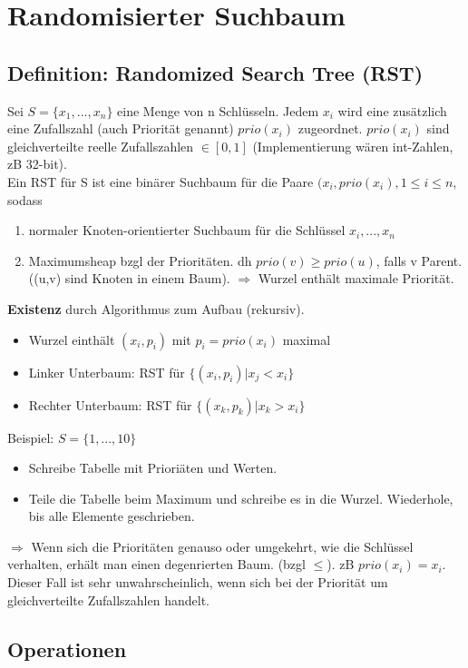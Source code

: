 \documentclass[10pt,a4paper]{article}
\begin{document}
\section*{Randomisierter Suchbaum}
\subsection*{Definition: Randomized Search Tree (RST)}
Sei $ S=\{x_1,...,x_n\} $ eine Menge von n Schlüsseln. Jedem $ x_i $ wird eine zusätzlich eine Zufallszahl (auch Priorität genannt) $ prio(x_i) $ zugeordnet. $ prio(x_i) $ sind gleichverteilte reelle Zufallszahlen $ \in [0,1] $ (Implementierung wären int-Zahlen, zB 32-bit). \\
Ein RST für S ist eine binärer Suchbaum für die Paare $ (x_i, prio(x_i), 1 \leq i \leq n $, sodass
\begin{enumerate}
	\item normaler Knoten-orientierter Suchbaum für die Schlüssel $ x_i,...,x_n $
	\item Maximumsheap bzgl der Prioritäten. dh $ prio(v) \geq prio(u) $, falls v Parent. ((u,v) sind Knoten in einem Baum). $ \Rightarrow $ Wurzel enthält maximale Priorität.
\end{enumerate}
\textbf{Existenz} durch Algorithmus zum Aufbau (rekursiv).
\begin{itemize}
	\item Wurzel einthält $ (x_i, p_i) $ mit $ p_i = prio(x_i) $ maximal
	\item Linker Unterbaum: RST für $ \{(x_i, p_i)| x_j < x_i \} $
	\item Rechter Unterbaum: RST für $ \{(x_k, p_k)| x_k > x_i \} $
\end{itemize}
Beispiel: $ S=\{1,...,10\} $
\begin{itemize}
	\item Schreibe Tabelle mit Prioriäten und Werten.
	\item Teile die Tabelle beim Maximum und schreibe es in die Wurzel. Wiederhole, bis alle Elemente geschrieben.
\end{itemize}
$ \Rightarrow $ Wenn sich die Prioritäten genauso oder umgekehrt, wie die Schlüssel verhalten, erhält man einen degenrierten Baum. (bzgl $ \leq $). zB $ prio(x_i) = x_i $. Dieser Fall ist sehr unwahrscheinlich, wenn sich bei der Priorität um gleichverteilte Zufallszahlen handelt. 

\subsection*{Operationen}
\end{document}
